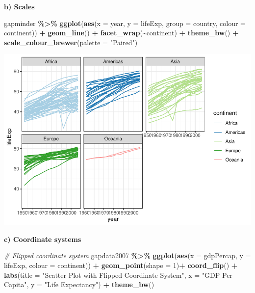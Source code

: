\documentclass[
]{book}
\newenvironment{Shaded}{\begin{snugshade}}{\end{snugshade}}
\newcommand{\AttributeTok}[1]{\textcolor[rgb]{0.13,0.29,0.53}{#1}}
\newcommand{\CommentTok}[1]{\textcolor[rgb]{0.56,0.35,0.01}{\textit{#1}}}
\newcommand{\DecValTok}[1]{\textcolor[rgb]{0.00,0.00,0.81}{#1}}
\newcommand{\FunctionTok}[1]{\textcolor[rgb]{0.13,0.29,0.53}{\textbf{#1}}}
\newcommand{\NormalTok}[1]{#1}
\newcommand{\SpecialCharTok}[1]{\textcolor[rgb]{0.81,0.36,0.00}{\textbf{#1}}}
\newcommand{\StringTok}[1]{\textcolor[rgb]{0.31,0.60,0.02}{#1}}
\begin{document}
\textbf{b) Scales}

\begin{Shaded}
\begin{Highlighting}[]
\NormalTok{gapminder }\SpecialCharTok{\%\textgreater{}\%}
\FunctionTok{ggplot}\NormalTok{(}\FunctionTok{aes}\NormalTok{(}\AttributeTok{x =}\NormalTok{ year, }\AttributeTok{y =}\NormalTok{ lifeExp, }\AttributeTok{group =}\NormalTok{ country, }\AttributeTok{colour =}\NormalTok{ continent)) }\SpecialCharTok{+}
\FunctionTok{geom\_line}\NormalTok{() }\SpecialCharTok{+}
\FunctionTok{facet\_wrap}\NormalTok{(}\SpecialCharTok{\textasciitilde{}}\NormalTok{continent) }\SpecialCharTok{+}
\FunctionTok{theme\_bw}\NormalTok{() }\SpecialCharTok{+}
\FunctionTok{scale\_colour\_brewer}\NormalTok{(}\AttributeTok{palette =} \StringTok{"Paired"}\NormalTok{)}
\end{Highlighting}
\end{Shaded}

\includegraphics{_main_files/figure-latex/unnamed-chunk-85-1.pdf}

\textbf{c) Coordinate systems}

\begin{Shaded}
\begin{Highlighting}[]
\CommentTok{\# Flipped coordinate system}
\NormalTok{gapdata2007 }\SpecialCharTok{\%\textgreater{}\%}
\FunctionTok{ggplot}\NormalTok{(}\FunctionTok{aes}\NormalTok{(}\AttributeTok{x =}\NormalTok{ gdpPercap, }\AttributeTok{y =}\NormalTok{ lifeExp, }\AttributeTok{colour =}\NormalTok{ continent)) }\SpecialCharTok{+}
\FunctionTok{geom\_point}\NormalTok{(}\AttributeTok{shape =} \DecValTok{1}\NormalTok{)}\SpecialCharTok{+}
  \FunctionTok{coord\_flip}\NormalTok{() }\SpecialCharTok{+}
  \FunctionTok{labs}\NormalTok{(}\AttributeTok{title =} \StringTok{"Scatter Plot with Flipped Coordinate System"}\NormalTok{,}
       \AttributeTok{x =} \StringTok{"GDP Per Capita"}\NormalTok{, }\AttributeTok{y =} \StringTok{"Life Expectancy"}\NormalTok{) }\SpecialCharTok{+}
  \FunctionTok{theme\_bw}\NormalTok{()}
\end{Highlighting}
\end{Shaded}
\end{document}
